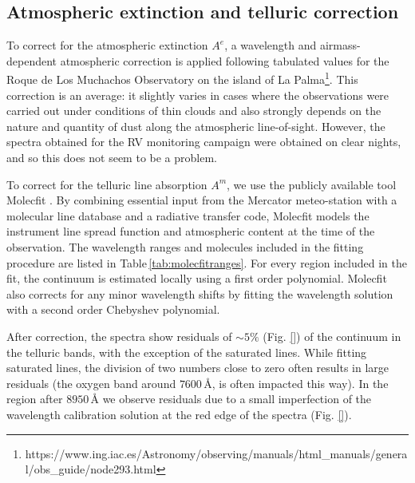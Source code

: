 \subsection{Atmospheric extinction and telluric correction}
\label{sec:atm_corr}
To correct for the atmospheric extinction $A^e$, a wavelength and airmass-dependent atmospheric correction is applied following tabulated values for the Roque de Los Muchachos Observatory on the island of La Palma\footnote{https://www.ing.iac.es/Astronomy/observing/manuals/html\_manuals/general/obs\_guide/node293.html}. This correction is an average: it slightly varies in cases where the observations were carried out under conditions of thin clouds and also strongly depends on the nature and quantity of dust along the atmospheric line-of-sight. However, the spectra obtained for the RV monitoring campaign were obtained on clear nights, and so this does not seem to be a problem.

To correct for the telluric line absorption $A^m$, we use the publicly available tool Molecfit \citep{smette_molecfit_2015,kausch_molecfit_2015}. By combining essential input from the Mercator meteo-station with a molecular line database and a radiative transfer code, Molecfit models the instrument line spread function and atmospheric content at the time of the observation. The wavelength ranges and molecules included in the fitting procedure are listed in Table\,\ref{tab:molecfitranges}. For every region included in the fit, the continuum is estimated locally using a first order polynomial. Molecfit also corrects for any minor wavelength shifts by fitting the wavelength solution with a second order Chebyshev polynomial. 

After correction, the spectra show residuals of $\sim\!\!5\%$ (Fig. \ref{}) of the continuum in the telluric bands, with the exception of the saturated lines. While fitting saturated lines, the division of two numbers close to zero often results in large residuals (the oxygen band around $7600\,$\r{A}, is often impacted this way). In the region after $8950\,$\r{A} we observe residuals due to a small imperfection of the wavelength calibration solution at the red edge of the spectra (Fig. \ref{}).

